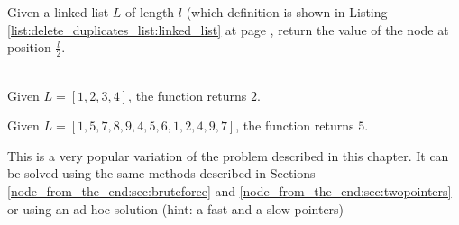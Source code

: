 \begin{exercise}
Given a linked list $L$ of length $l$ (which definition is shown in Listing \ref{list:delete_duplicates_list:linked_list} at page \pageref{list:delete_duplicates_list:linked_list} , return the value of the node at position $\frac{l}{2}$.
\begin{example}
	\hfill \\
	Given $L=[1,2,3,4]$, the function returns $2$.
\end{example}

\begin{example}
	Given $L=[1,5,7,8,9,4,5,6,1,2,4,9,7]$, the function returns $5$.
\end{example}
\end{exercise}
This is a very popular variation of the problem described in this chapter. It can be solved using the same methods described in Sections \ref{node_from_the_end:sec:bruteforce} and \ref{node_from_the_end:sec:twopointers} or using an ad-hoc solution (hint: a fast and a slow pointers) 